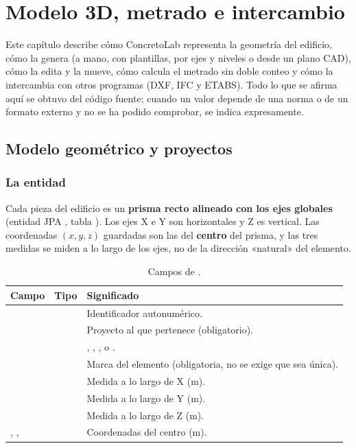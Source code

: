 \section{Modelo 3D, metrado e intercambio}
\label{sec:mod}

Este capítulo describe cómo ConcretoLab representa la geometría del edificio, cómo la genera (a mano, con plantillas,
por ejes y niveles o desde un plano CAD), cómo la edita y la mueve, cómo calcula el metrado sin doble conteo y cómo la
intercambia con otros programas (DXF, IFC y ETABS). Todo lo que se afirma aquí se obtuvo del código fuente; cuando un
valor depende de una norma o de un formato externo y no se ha podido comprobar, se indica expresamente.

\subsection{Modelo geométrico y proyectos}
\label{sec:mod-modelo}

\subsubsection{La entidad \texorpdfstring{}{Elemento}}

Cada pieza del edificio es un \textbf{prisma recto alineado con los ejes globales} (entidad JPA ,
tabla ). Los ejes X e Y son horizontales y Z es vertical. Las coordenadas $(x, y, z)$ guardadas son las
del \textbf{centro} del prisma, y las tres medidas se miden a lo largo de los ejes, no de la dirección «natural» del
elemento.

\begin{table}[H]
	\centering
	\caption{Campos de .}
	\label{tab:mod-elemento}
	\begin{tabular}{L{2.6cm}L{2.4cm}L{8.6cm}}
		\hline
		\textbf{Campo} & \textbf{Tipo} & \textbf{Significado} \\ \hline
		 &  & Identificador autonumérico. \\
		 &  & Proyecto al que pertenece (obligatorio). \\
		 &  & , , ,  o . \\
		 &  & Marca del elemento (obligatoria, no se exige que sea única). \\
		 &  & Medida a lo largo de X (m). \\
		 &  & Medida a lo largo de Y (m). \\
		 &  & Medida a lo largo de Z (m). \\
		, ,  &  & Coordenadas del centro (m). \\
		\hline
	\end{tabular}
\end{table}

